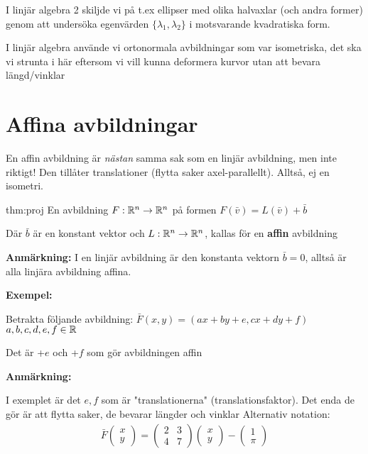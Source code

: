 \noindent I linjär algebra 2 skiljde vi på t.ex ellipser med olika halvaxlar (och andra former) genom att undersöka egenvärden $\{\lambda_1, \lambda_2\}$ i motsvarande kvadratiska form.\par
\noindent I linjär algebra använde vi ortonormala avbildningar som var isometriska, det ska vi strunta i här eftersom vi vill kunna deformera kurvor utan att bevara längd/vinklar
\par\bigskip
\section{Affina avbildningar}
\par\bigskip
\noindent En affin avbildning är \textit{nästan} samma sak som en linjär avbildning, men inte riktigt! Den tillåter translationer (flytta saker axel-parallellt). Alltså, ej en isometri.
\par\bigskip
\begin{theo}[Avbildning]{thm:proj}
  En avbildning $F:\mathbb{R}^n\to\mathbb{R}^n$ på formen $F(\bar{v}) = L(\bar{v})+\bar{b}$\par
  \noindent Där $\bar{b}$ är en konstant vektor och $L:\mathbb{R}^n\to\mathbb{R}^n$, kallas för en \textbf{affin} avbildning
\end{theo}
\par\bigskip
\noindent\textbf{Anmärkning:}
\noindent I en linjär avbildning är den konstanta vektorn $\bar{b} = 0$, alltså är alla linjära avbildning affina.
\par\bigskip
\noindent\textbf{Exempel:}\par
\noindent Betrakta följande avbildning: $\bar{F}(x,y) = (ax+by+e, cx+dy+f)$ $a,b,c,d,e,f\in\mathbb{R}$\par
\noindent Det är +$e$ och +$f$ som gör avbildningen affin\par
\par\bigskip
\noindent\textbf{Anmärkning:}\par
\noindent I exemplet är det $e,f$ som är "translationerna" (translationsfaktor). Det enda de gör är att flytta saker, de bevarar längder och vinklar
\noindent Alternativ notation:
\begin{equation*}
  \begin{gathered}
    \bar{F}\begin{pmatrix}x\\y\end{pmatrix} = \begin{pmatrix}2&3\\4&7\end{pmatrix}\begin{pmatrix}x\\y\end{pmatrix}-\begin{pmatrix}1\\\pi\end{pmatrix}
  \end{gathered}
\end{equation*}
